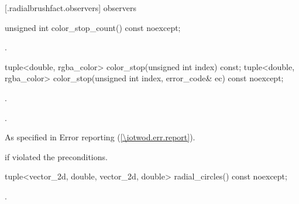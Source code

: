  [\iotwod.radialbrushfact.observers] { observers}

\begin{itemdecl}
    unsigned int color_stop_count() const noexcept;
\end{itemdecl}
\begin{itemdescr}
	\pnum
	\returns
	.

\end{itemdescr}

\begin{itemdecl}
    tuple<double, rgba_color> color_stop(unsigned int index) const;
    tuple<double, rgba_color> color_stop(unsigned int index,
      error_code& ec) const noexcept;
\end{itemdecl}
\begin{itemdescr}
	\pnum
	\preconditions
	.
	
	\pnum
	\returns
	.

	\throws
	As specified in Error reporting (\ref{\iotwod.err.report}).
	
	\pnum
	\errors
	 if  violated the preconditions.

\end{itemdescr}

\begin{itemdecl}
    tuple<vector_2d, double, vector_2d, double> radial_circles() const noexcept;
\end{itemdecl}
\begin{itemdescr}
	\pnum
	\returns
	.

\end{itemdescr}
